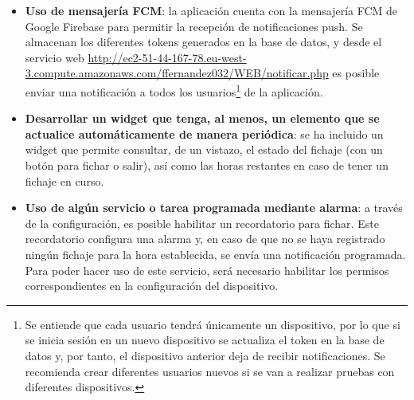 \begin{itemize}
    \item \textbf{Uso de mensajería FCM}: la aplicación cuenta con la mensajería FCM de Google Firebase para permitir la recepción de notificaciones push. Se almacenan los diferentes tokens generados en la base de datos, y desde el servicio web \url{http://ec2-51-44-167-78.eu-west-3.compute.amazonaws.com/ffernandez032/WEB/notificar.php} es posible enviar una notificación a todos los usuarios\footnote{Se entiende que cada usuario tendrá únicamente un dispositivo, por lo que si se inicia sesión en un nuevo dispositivo se actualiza el token en la base de datos y, por tanto, el dispositivo anterior deja de recibir notificaciones. Se recomienda crear diferentes usuarios nuevos si se van a realizar pruebas con diferentes dispositivos.} de la aplicación.
    \item \textbf{Desarrollar un widget que tenga, al menos, un elemento que se actualice automáticamente de manera periódica}: se ha incluido un widget que permite consultar, de un vistazo, el estado del fichaje (con un botón para fichar o salir), así como las horas restantes en caso de tener un fichaje en curso.
    \item \textbf{Uso de algún servicio o tarea programada mediante alarma}: a través de la configuración, es posible habilitar un recordatorio para fichar. Este recordatorio configura una alarma y, en caso de que no se haya registrado ningún fichaje para la hora establecida, se envía una notificación programada. Para poder hacer uso de este servicio, será necesario habilitar los permisos correspondientes en la configuración del dispositivo.
\end{itemize}